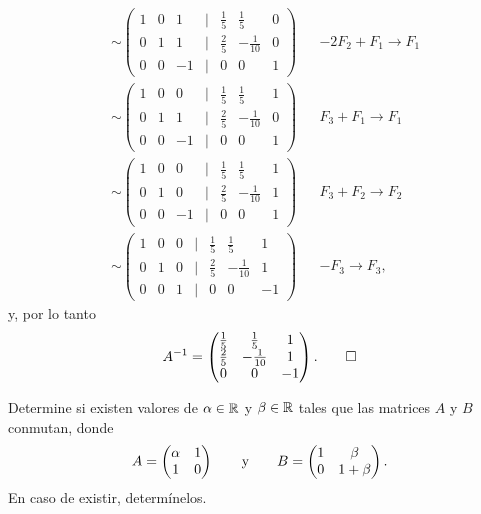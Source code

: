 \documentclass[11pt,respuestas,a4]{aleph-examen}
\begin{document}
\begin{preguntas}
\begin{respuesta}
\begin{align*}
        & \sim \begin{pmatrix}
            1 & 0 & 1 & | & \frac{1}{5} & \frac{1}{5} & 0 \\
            0 & 1 & 1 & | & \frac{2}{5} & -\frac{1}{10} & 0 \\
            0 & 0 & -1 & | & 0 & 0 & 1
        \end{pmatrix} && - 2F_2 + F_1 \rightarrow F_1 \\
        & \sim \begin{pmatrix}
            1 & 0 & 0 & | & \frac{1}{5} & \frac{1}{5} & 1 \\
            0 & 1 & 1 & | & \frac{2}{5} & -\frac{1}{10} & 0 \\
            0 & 0 & -1 & | & 0 & 0 & 1
        \end{pmatrix} &&  F_3 + F_1 \rightarrow F_1 \\
        & \sim \begin{pmatrix}
            1 & 0 & 0 & | & \frac{1}{5} & \frac{1}{5} & 1 \\
            0 & 1 & 0 & | & \frac{2}{5} & -\frac{1}{10} & 1 \\
            0 & 0 & -1 & | & 0 & 0 & 1
        \end{pmatrix} && F_3 + F_2 \rightarrow F_2 \\
        & \sim \begin{pmatrix}
            1 & 0 & 0 & | & \frac{1}{5} & \frac{1}{5} & 1 \\
            0 & 1 & 0 & | & \frac{2}{5} & -\frac{1}{10} & 1 \\
            0 & 0 & 1 & | & 0 & 0 & -1
        \end{pmatrix} && - F_3 \rightarrow F_3,
    \end{align*}
    y, por lo tanto
    \[
        A^{-1} = \begin{pmatrix}
            \frac{1}{5} & \frac{1}{5} & 1 \\
            \frac{2}{5} & -\frac{1}{10} & 1 \\
            0 & 0 & -1
        \end{pmatrix}.    \qedhere
    \]

\end{respuesta}
\item
    Determine si existen valores de $\alpha\in\mathbb{R}$ y $\beta\in\mathbb{R}$ tales que las matrices $A$ y $B$ conmutan, donde
    \[
    A = \begin{pmatrix}
        \alpha & 1 \\
        1 & 0
    \end{pmatrix} \qquad\text{y}\qquad B = \begin{pmatrix}
        1 & \beta \\
        0 & 1+\beta
    \end{pmatrix}.
    \]
    En caso de existir, determínelos.


\end{preguntas}
\end{document}
